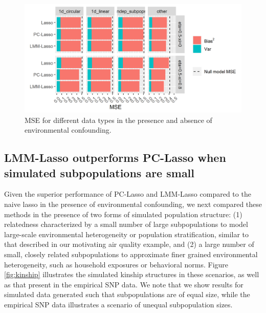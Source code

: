 
\begin{figure}[H]
    \centering
    \includegraphics[scale = 1.1]{figures/beta_mse.png}
    \caption{MSE for different data types in the presence and absence of environmental confounding. }
    \label{fig:mse}
\end{figure}

\subsection{LMM-Lasso outperforms PC-Lasso when simulated subpopulations are small}
Given the superior performance of PC-Lasso and LMM-Lasso compared to the naive lasso in the presence of environmental confounding, we next compared these methods in the presence of two forms of simulated population structure: (1) relatedness characterized by a small number of large subpopulations to model large-scale environmental heterogeneity or population stratification, similar to that described in our motivating air quality example, and (2) a large number of small, closely related subpopulations to approximate finer grained environmental heterogeneity, such as household exposures or behavioral norms. Figure \ref{fig:kinship} illustrates the simulated kinship structures in these scenarios, as well as that present in the empirical SNP data. We note that we show results for simulated data generated such that subpopulations are of equal size, while the empirical SNP data illustrates a scenario of unequal subpopulation sizes.

